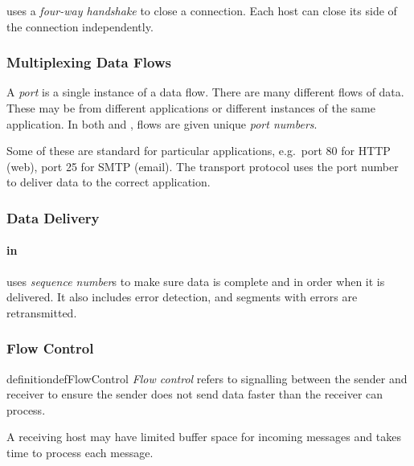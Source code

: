 \begin{definition}\label{def:TCP_4_Way_Handshake}
   uses a \emph{four-way handshake} to close a connection.
  Each host can close its side of the connection independently.
\end{definition}

\subsubsection{Multiplexing Data Flows}\label{subsubsec:Multiplexing_Data_Flows}
\begin{definition}[Port]\label{def:Port}
  A \emph{port} is a single instance of a data flow.
  There are many different flows of data.
  These may be from different applications or different instances of the same application.
  In both  and , flows are given unique \emph{port numbers}.

  Some of these are standard for particular applications, e.g.\ port 80 for HTTP (web), port 25 for SMTP (email).
  The transport protocol uses the port number to deliver data to the correct application.
\end{definition}

\subsubsection{Data Delivery}\label{subsubsec:Data_Delivery}
\paragraph{ in }\label{par:TCP_Data_Delivery}
\begin{definition}\label{def:Sequence_Number}
   uses \emph{sequence number}s to make sure data is complete and in order when it is delivered.
  It also includes error detection, and segments with errors are retransmitted.
\end{definition}

\subsubsection{Flow Control}\label{subsubsec:TCP_Flow_Control}
\begin{restatable}{definition}{defFlowControl}\label{def:Flow_Control}
  \emph{Flow control} refers to signalling between the sender and receiver to ensure the sender does not send data faster than the receiver can process.

  A receiving host may have limited buffer space for incoming messages and takes time to process each message.
\end{restatable}


